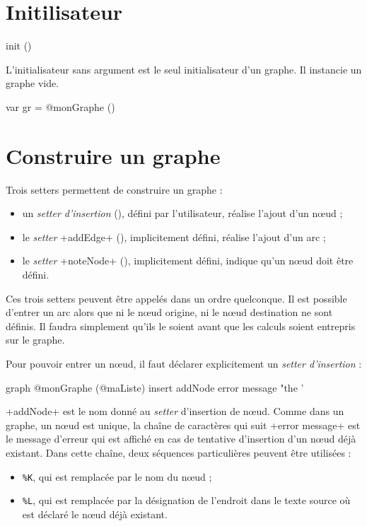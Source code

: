 \section{Initilisateur}

\begin{galgas4}
init ()
\end{galgas4}

L'initialisateur sans argument est le seul initialisateur d'un graphe. Il instancie un graphe vide.

\begin{galgas4}
var gr = @monGraphe ()
\end{galgas4}



\section{Construire un graphe}

Trois setters permettent de construire un graphe :
\begin{itemize}
  \item un \emph{setter d'insertion} (), défini par l'utilisateur, réalise l'ajout d'un nœud ;
  \item le \emph{setter} \ggsq+addEdge+ (), implicitement défini, réalise l'ajout d'un arc ;
  \item le \emph{setter} \ggsq+noteNode+ (), implicitement défini, indique qu'un nœud doit être défini.
\end{itemize}

Ces trois setters peuvent être appelés dans un ordre quelconque. Il est possible d'entrer un arc alors que ni le nœud origine, ni le nœud destination ne sont définis. Il faudra simplement qu'ils le soient avant que les calculs soient entrepris sur le graphe.


Pour pouvoir entrer un nœud, il faut déclarer explicitement un \emph{setter d'insertion} :
\begin{galgas4}
graph @monGraphe (@maListe) {
  insert addNode error message "the '%
}
\end{galgas4}

\ggsq+addNode+ est le nom donné au \emph{setter} d'insertion de nœud. Comme dans un graphe, un nœud est unique, la chaîne de caractères qui suit \ggsq+error message+ est le message d'erreur qui est affiché en cas de tentative d'insertion d'un nœud déjà existant. Dans cette chaîne, deux séquences particulières peuvent être utilisées :
\begin{itemize}
  \item \texttt{\%K}, qui est remplacée par le nom du nœud ;
  \item \texttt{\%L}, qui est remplacée par la désignation de l'endroit dans le texte source où est déclaré le nœud déjà existant.
\end{itemize}

